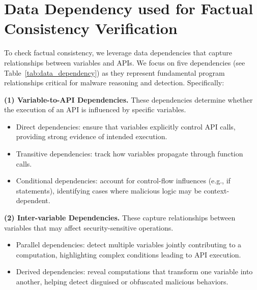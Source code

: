 \section{Data Dependency used for Factual Consistency Verification}
\label{datadependency}
\noindent To check factual consistency, we leverage data dependencies that capture relationships between variables and APIs. We focus on five dependencies (see Table~\ref{tab:data_dependency}) as they represent fundamental program relationships critical for malware reasoning and detection. Specifically:

\vspace{0.5em}
\noindent \hspace{0.5em} \textbf{(1) Variable-to-API Dependencies.} These dependencies determine whether the execution of an API is influenced by specific variables.


\begin{itemize}
    \item Direct dependencies: ensure that variables explicitly control API calls, providing strong evidence of intended execution.
    \item Transitive dependencies: track how variables propagate through function calls.
    \item Conditional dependencies: account for control-flow influences (e.g., if statements), identifying cases where malicious logic may be context-dependent.
\end{itemize}

\noindent \hspace{0.5em} \textbf{(2) Inter-variable Dependencies.} These capture relationships between variables that may affect security-sensitive operations.

\begin{itemize}
    \item Parallel dependencies: detect multiple variables jointly contributing to a computation, highlighting complex conditions leading to API execution.
    \item Derived dependencies: reveal computations that transform one variable into another, helping detect disguised or obfuscated malicious behaviors.
\end{itemize}





